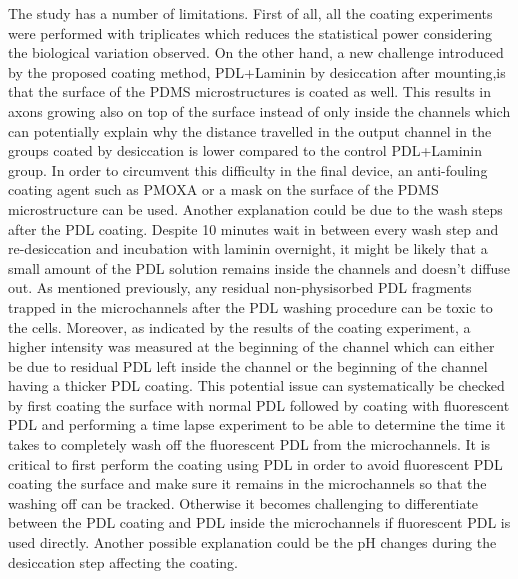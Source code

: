 \quad The study has a number of limitations. First of all, all the coating experiments were performed with triplicates which reduces the statistical power considering the biological variation observed. On the other hand, a new challenge introduced by the proposed coating method, PDL+Laminin by desiccation after mounting,is that the surface of the PDMS microstructures is coated as well. This results in axons growing also on top of the surface instead of only inside the channels which can potentially explain why the distance travelled in the output channel in the groups coated by desiccation is lower compared to the control PDL+Laminin group. In order to circumvent this difficulty in the final device, an anti-fouling coating agent such as PMOXA \cite{weydert2017easy} or a mask on the surface of the PDMS microstructure can be used.  Another explanation could be due to the wash steps after the PDL coating. Despite 10 minutes wait in between every wash step and re-desiccation and incubation with laminin overnight, it might be likely that a small amount of the PDL solution remains inside the channels and doesn't diffuse out. As mentioned previously, any residual non-physisorbed PDL fragments trapped in the microchannels after the PDL washing procedure can be toxic to the cells. Moreover, as indicated by the results of the coating experiment, a higher intensity was measured at the beginning of the channel which can either be due to residual PDL left inside the channel or the beginning of the channel having a thicker PDL coating. This potential issue can systematically be checked by first coating the surface with normal PDL followed by coating with fluorescent PDL and performing a time lapse experiment to be able to determine the time it takes to completely wash off the fluorescent PDL from the microchannels. It is critical to first perform the coating using PDL in order to avoid fluorescent PDL coating the surface and make sure it remains in the microchannels so that the washing off can be tracked. Otherwise it becomes challenging to differentiate between the PDL coating and PDL inside the microchannels if fluorescent PDL is used directly. Another possible explanation could be the pH changes during the desiccation step affecting the coating. 

